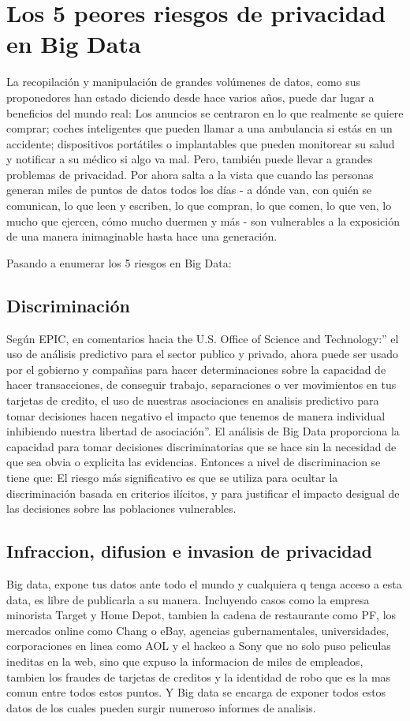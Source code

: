 \documentclass[journal]{IEEEtran}
\begin{document}
\section{Los 5 peores riesgos de privacidad en Big Data}
La recopilación y manipulación de grandes volúmenes de datos, como sus proponedores han estado diciendo desde hace varios años, puede dar lugar a beneficios del mundo real: Los anuncios se centraron en lo que realmente se quiere comprar; coches inteligentes que pueden llamar a una ambulancia si estás en un accidente; dispositivos portátiles o implantables que pueden monitorear su salud y notificar a su médico si algo va mal.
Pero, también puede llevar a grandes problemas de privacidad. Por ahora salta a la vista que cuando las personas generan miles de puntos de datos todos los días - a dónde van, con quién se comunican, lo que leen y escriben, lo que compran, lo que comen, lo que ven, lo mucho que ejercen, cómo mucho duermen y más - son vulnerables a la exposición de una manera inimaginable hasta hace una generación.

Pasando a enumerar los 5 riesgos en Big Data:
\subsection{Discriminación}
Según EPIC, en comentarios hacia the U.S. Office of Science and Technology:” el uso de análisis predictivo para el sector publico y privado, ahora puede ser usado por el gobierno y compañias para hacer determinaciones sobre la capacidad de hacer transacciones, de conseguir trabajo, separaciones o ver movimientos en tus tarjetas de credito, el uso de nuestras asociaciones en analisis predictivo para tomar decisiones hacen negativo el impacto que tenemos de manera individual inhibiendo nuestra libertad de asociación”. 
El análisis de Big Data proporciona la capacidad para tomar decisiones discriminatorias que se hace sin la necesidad de que sea obvia o explicita las evidencias. Entonces a nivel de discriminacion se tiene que:
El riesgo más significativo es que se utiliza para ocultar la discriminación basada en criterios ilícitos, y para justificar el impacto desigual de las decisiones sobre las poblaciones vulnerables.

\subsection{Infraccion, difusion e invasion de privacidad}
Big data, expone tus datos ante todo el mundo y cualquiera q tenga acceso a esta data, es libre de publicarla a su manera. Incluyendo casos como la empresa minorista Target y Home Depot, tambien la cadena de restaurante como PF, los mercados online como Chang o eBay, agencias gubernamentales, universidades, corporaciones en linea como AOL y el hackeo a Sony que no solo puso peliculas ineditas en la web, sino que expuso la informacion de miles de empleados, tambien los fraudes de tarjetas de creditos y la identidad de robo que es la mas comun entre todos estos puntos. Y Big data se encarga de exponer todos estos datos de los cuales pueden surgir numeroso informes de analisis.
\end{document}
